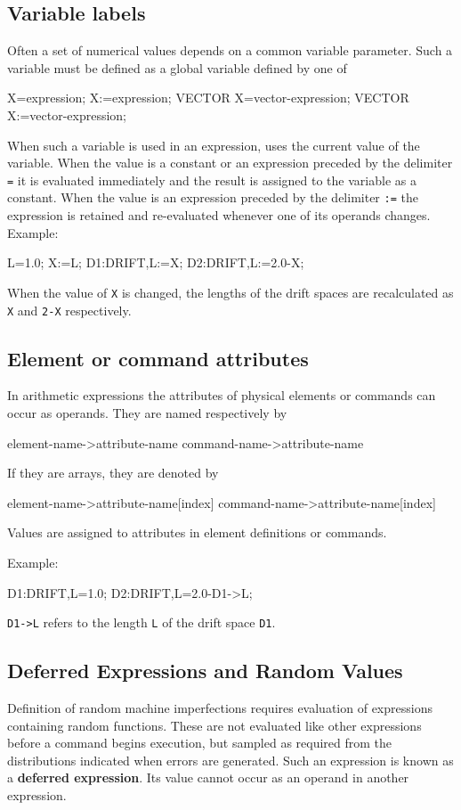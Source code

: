 \subsection{Variable labels}
\label{sec:avariable}
Often a set of numerical values depends
on a common variable parameter.
Such a variable must be defined as a global
variable  defined by one of
\begin{example}
X=expression;
X:=expression;
VECTOR X=vector-expression;
VECTOR X:=vector-expression;
\end{example}
When such a variable is used in an expression,
\opal uses the current value of the variable.
When the value is a constant or an expression preceded by the delimiter
\texttt{=} it is evaluated immediately and the result is assigned to the
variable as a constant.
When the value is an expression preceded by the delimiter \texttt{:=}
the expression is retained and re-evaluated whenever one of its operands
changes.\\
\noindent Example:
\begin{example}
L=1.0;
X:=L;
D1:DRIFT,L:=X;
D2:DRIFT,L:=2.0-X;
\end{example}
When the value of \texttt{X} is changed,
the lengths of the drift spaces are recalculated as
\texttt{X} and \texttt{2-X} respectively.

\subsection{Element or command attributes}
In arithmetic expressions the attributes of physical elements
or commands can occur as operands.
They are named respectively by
\begin{example}
element-name->attribute-name
command-name->attribute-name
\end{example}
If they are arrays, they are denoted by
\begin{example}
element-name->attribute-name[index]
command-name->attribute-name[index]
\end{example}
Values are assigned to attributes in element definitions or commands.

\noindent Example:
\begin{example}
D1:DRIFT,L=1.0;
D2:DRIFT,L=2.0-D1->L;
\end{example}
\texttt{D1->L} refers to the length \texttt{L} of the drift space \texttt{D1}.

\subsection{Deferred Expressions and Random Values}
\label{sec:adefer}
Definition of random machine imperfections requires evaluation
of expressions containing random functions.
These are not evaluated like other expressions before a command
begins execution, but sampled as required from the distributions
indicated when errors are generated.
Such an expression is known as a \textbf{deferred expression}.
Its value cannot occur as an operand in another expression.

